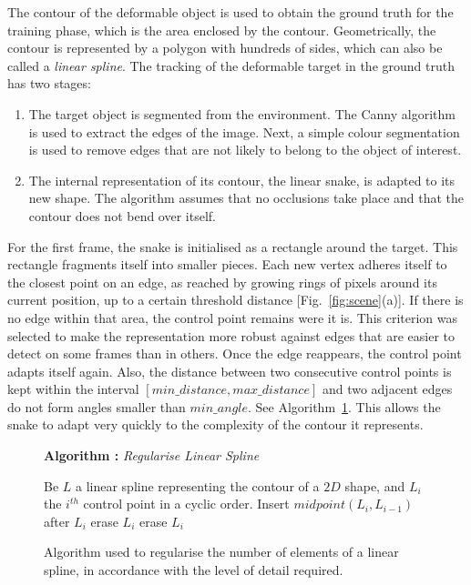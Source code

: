 \documentclass[journal]{IEEEtran}
\newcommand{\fref}[1]{Fig.~\ref{#1}}
\newcommand{\alref}[1]{Algorithm~\ref{#1}}
\newcounter{algorithm}
\newenvironment{algorithmicieee}[1]
  {\refstepcounter{algorithm}
   \begin{lrbox}{\ieeealgbox}
   \begin{minipage}{\dimexpr\columnwidth-2\fboxsep-2\fboxrule}
   \textbf{Algorithm \arabic{algorithm}:} \textit{#1} \par
   \begin{algorithmic}[1]}
  {\end{algorithmic}
   \end{minipage}
   \end{lrbox}\noindent\fbox{\usebox{\ieeealgbox}}}
\begin{document}
The contour of the deformable object is used to obtain the ground truth for the training phase, which is the area enclosed by the contour. Geometrically, the contour is represented by a polygon with hundreds of sides, which can also be called a \textit{linear spline}.  The tracking of the deformable target in the ground truth has two stages:
\begin{enumerate}
 \item The target object is segmented from the environment.  The Canny algorithm is used to extract the edges of the image.  Next, a simple colour segmentation is used to remove edges that are not likely to belong to the object of interest.
 \item The internal representation of its contour, the linear snake, is adapted to its new shape.  The algorithm assumes that no occlusions take place and that the contour does not bend over itself.
\end{enumerate}
For the first frame, the snake is initialised as a rectangle around the target. This rectangle fragments itself into smaller pieces. Each new vertex adheres itself to the closest point on an edge, as reached by growing rings of pixels around its current position, up to a certain threshold distance [\fref{fig:scene}(a)].  If there is no edge within that area, the control point remains were it is. This criterion was selected to make the representation more robust against edges that are easier to detect on some frames than in others.  Once the edge reappears, the control point adapts itself again.  Also, the distance between two consecutive control points is kept within the interval $[min\_distance, max\_distance]$ and two adjacent edges do not form angles smaller than $min\_angle$.  See \alref{alg:regularise}.  This allows the snake to adapt very quickly to the complexity of the contour it represents.


\begin{figure}
 \begin{algorithmicieee}{Regularise Linear Spline}\label{alg:regularise}
 \STATE Be $L$ a linear spline representing the contour of a $2D$ shape, and $L_i$ the $i^{th}$ control point in a cyclic order.
  \STATE Insert $midpoint(L_i,L_{i-1})$ after $L_i$
  \STATE erase $L_i$
  \STATE erase $L_i$
 \ENDIF
 \ENDFOR
\end{algorithmicieee}
\caption{Algorithm used to regularise the number of elements of a linear spline, in accordance with the level of detail required.}
\end{figure}
\end{document}
